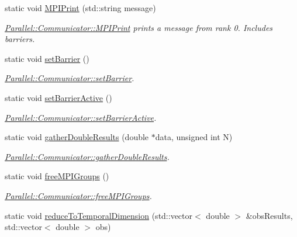 \begin{DoxyCompactItemize}
static void \mbox{\hyperlink{class_parallel_1_1_communicator_a34a1d27c0e2b2b101b97a53734dbc4f8}{M\+P\+I\+Print}} (std\+::string message)
\begin{DoxyCompactList}\small\item\em \mbox{\hyperlink{class_parallel_1_1_communicator_a34a1d27c0e2b2b101b97a53734dbc4f8}{Parallel\+::\+Communicator\+::\+M\+P\+I\+Print}} prints a message from rank 0. Includes barriers. \end{DoxyCompactList}\item 
static void \mbox{\hyperlink{class_parallel_1_1_communicator_a14aa3d54f5efe28094df886948e3dee2}{set\+Barrier}} ()
\begin{DoxyCompactList}\small\item\em \mbox{\hyperlink{class_parallel_1_1_communicator_a14aa3d54f5efe28094df886948e3dee2}{Parallel\+::\+Communicator\+::set\+Barrier}}. \end{DoxyCompactList}\item 
static void \mbox{\hyperlink{class_parallel_1_1_communicator_af61a4b8a49509982ae96d2a99dfb9f49}{set\+Barrier\+Active}} ()
\begin{DoxyCompactList}\small\item\em \mbox{\hyperlink{class_parallel_1_1_communicator_af61a4b8a49509982ae96d2a99dfb9f49}{Parallel\+::\+Communicator\+::set\+Barrier\+Active}}. \end{DoxyCompactList}\item 
static void \mbox{\hyperlink{class_parallel_1_1_communicator_ae5739683ff54a7c39af6e37920e70ea5}{gather\+Double\+Results}} (double $\ast$data, unsigned int N)
\begin{DoxyCompactList}\small\item\em \mbox{\hyperlink{class_parallel_1_1_communicator_ae5739683ff54a7c39af6e37920e70ea5}{Parallel\+::\+Communicator\+::gather\+Double\+Results}}. \end{DoxyCompactList}\item 
static void \mbox{\hyperlink{class_parallel_1_1_communicator_aca0ac979aee1a649dbe5d4582b06a707}{free\+M\+P\+I\+Groups}} ()
\begin{DoxyCompactList}\small\item\em \mbox{\hyperlink{class_parallel_1_1_communicator_aca0ac979aee1a649dbe5d4582b06a707}{Parallel\+::\+Communicator\+::free\+M\+P\+I\+Groups}}. \end{DoxyCompactList}\item 
static void \mbox{\hyperlink{class_parallel_1_1_communicator_a5d42989e7a3022de6042e3503aa35346}{reduce\+To\+Temporal\+Dimension}} (std\+::vector$<$ double $>$ \&obs\+Results, std\+::vector$<$ double $>$ obs)

\end{DoxyCompactItemize}
